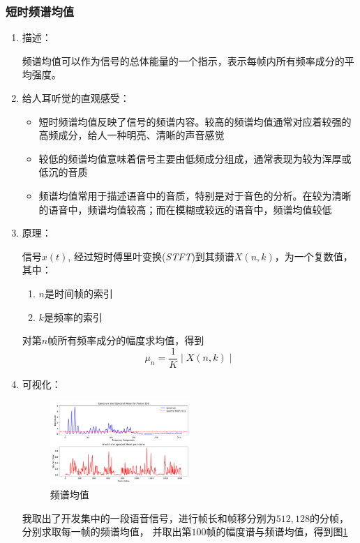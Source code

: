 \documentclass[a4paper]{article}
\begin{document}
\subsubsection{短时频谱均值}
\begin{enumerate}
  \item 
  {
    描述：

    频谱均值可以作为信号的总体能量的一个指示，表示每帧内所有频率成分的平均强度。
  }
  \item 
  {
    给人耳听觉的直观感受：
    \begin{itemize}
      \item 短时频谱均值反映了信号的频谱内容。较高的频谱均值通常对应着较强的高频成分，给人一种明亮、清晰的声音感觉

      \item 较低的频谱均值意味着信号主要由低频成分组成，通常表现为较为浑厚或低沉的音质
      
      \item 频谱均值常用于描述语音中的音质，特别是对于音色的分析。在较为清晰的语音中，频谱均值较高；而在模糊或较远的语音中，频谱均值较低
    \end{itemize}
  }
  \item 
  {
    原理：

    信号$x(t)$, 经过短时傅里叶变换(\emph{STFT})到其频谱$X(n ,k)$，为一个复数值，其中：
    \begin{enumerate}
      \item $n$是时间帧的索引
      \item $k$是频率的索引
    \end{enumerate}
    对第$n$帧所有频率成分的幅度求均值，得到
    \begin{equation}
      \mu_n = \frac{1}{K}\mid X(n, k) \mid
    \end{equation}
  }
  \item 
  {
    可视化：
    \begin{figure}[H]
      \centering
      \includegraphics[width=0.5\textwidth]{figs/spectral_mean.pdf}
      \caption{频谱均值}
      \label{fig:spectral mean}
    \end{figure}
    我取出了开发集中的一段语音信号，进行帧长和帧移分别为$512, 128$的分帧，分别求取每一帧的频谱均值，
    并取出第$100$帧的幅度谱与频谱均值，得到图\ref{fig:spectral mean}
  }
\end{enumerate}
\end{document}
